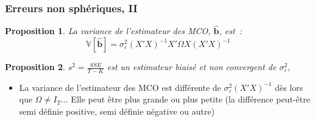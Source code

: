 \documentclass[10pt]{beamer}
\theoremstyle{plain}
\newtheorem{prop}{Proposition}
\begin{document}
\begin{frame}
  \frametitle{Erreurs non sphériques, II}

  \begin{prop}\label{prop:bhat:non-spherical-errors-2}
    La variance de l'estimateur des MCO, $\hat{\textbf{b}}$, est~:
    \[
      \mathbb V[\hat{\textbf{b}}] = \sigma_{\varepsilon}^2 (X'X)^{-1}X'\Omega X (X'X)^{-1}
    \]
  \end{prop}

  \begin{prop}\label{prop:bhat:non-spherical-errors-3}
    $s^2=\frac{SSE}{T-K}$ est un estimateur biaisé et non convergent de $\sigma_{\varepsilon}^2$,
  \end{prop}

  \bigskip

  \begin{itemize}

  \item La variance de l'estimateur des MCO est différente de $\sigma_{\varepsilon}^2 (X'X)^{-1}$ dès lors que $\Omega\neq I_T$... Elle peut être plus grande ou plus petite (la différence peut-être semi définie positive, semi définie négative ou autre)

  \end{itemize}

\end{frame}
\end{document}
